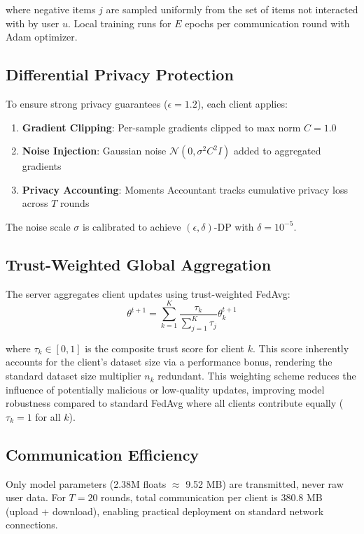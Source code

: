 \documentclass[12pt,a4paper]{report}
\begin{document}
{where negative items $j$ are sampled uniformly from the set of items not interacted with by user $u$. Local training runs for $E$ epochs per communication round with Adam optimizer.

\subsection{Differential Privacy Protection}
To ensure strong privacy guarantees ($\epsilon=1.2$), each client applies:
\begin{enumerate}
    \item \textbf{Gradient Clipping}: Per-sample gradients clipped to max norm $C=1.0$
    \item \textbf{Noise Injection}: Gaussian noise $\mathcal{N}(0, \sigma^2 C^2 I)$ added to aggregated gradients
    \item \textbf{Privacy Accounting}: Moments Accountant tracks cumulative privacy loss across $T$ rounds
\end{enumerate}

The noise scale $\sigma$ is calibrated to achieve $(\epsilon, \delta)$-DP with $\delta = 10^{-5}$.

\subsection{Trust-Weighted Global Aggregation}
The server aggregates client updates using trust-weighted FedAvg:
\begin{equation}
\theta^{t+1} = \sum_{k=1}^{K} \frac{\tau_k}{\sum_{j=1}^K \tau_j} \theta_k^{t+1}
\end{equation}

where $\tau_k \in [0,1]$ is the composite trust score for client $k$. This score inherently accounts for the client's dataset size via a performance bonus, rendering the standard dataset size multiplier $n_k$ redundant. This weighting scheme reduces the influence of potentially malicious or low-quality updates, improving model robustness compared to standard FedAvg where all clients contribute equally ($\tau_k = 1$ for all $k$).

\subsection{Communication Efficiency}
Only model parameters (2.38M floats $\approx$ 9.52 MB) are transmitted, never raw user data. For $T=20$ rounds, total communication per client is 380.8 MB (upload + download), enabling practical deployment on standard network connections.

}
\end{document}
